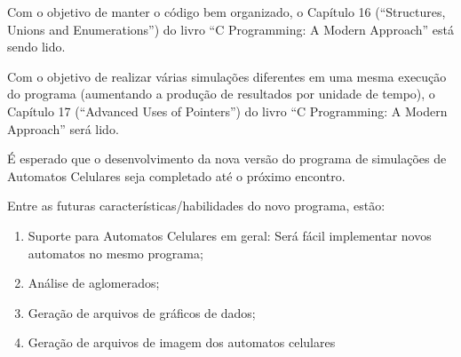 \documentclass[12pt,a4paper,final]{article}
\begin{document}
	Com o objetivo de manter o código bem organizado, o Capítulo 16 (``Structures, Unions and Enumerations'') do livro ``C Programming: A Modern Approach'' está sendo lido.

	Com o objetivo de realizar várias simulações diferentes em uma mesma execução do programa (aumentando a produção de resultados por unidade de tempo), o Capítulo 17 (``Advanced Uses of Pointers'') do livro ``C Programming: A Modern Approach'' será lido.

	É esperado que o desenvolvimento da nova versão do programa de simulações de Automatos Celulares seja completado até o próximo encontro.

	Entre as futuras características/habilidades do novo programa, estão:
	\begin{enumerate}
		\item Suporte para Automatos Celulares em geral: Será fácil implementar novos automatos no mesmo programa;
		\item Análise de aglomerados;
		\item Geração de arquivos de gráficos de dados;
		\item Geração de arquivos de imagem dos automatos celulares
	\end{enumerate}
\end{document}
